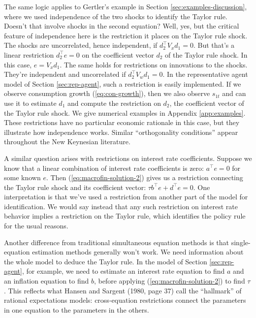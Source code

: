 \documentclass[12pt]{article}
\begin{document}
{The same logic applies to Gertler's example in Section \ref{sec:examples-discussion},
where we used independence of the two shocks to identify the Taylor rule.
Doesn't that involve shocks in the second equation?
Well, yes, but the critical feature of independence here
is the restriction it places on the Taylor rule shock.
The shocks are uncorrelated, hence independent, if $d_2^\top V_x d_1 = 0$.
But that's a linear restriction $d_2^\top e = 0$ on the coefficient vector $d_2$ of the Taylor rule shock.  In this case, $e = V_x d_1$.
The same holds for restrictions on innovations to the shocks.
They're independent and uncorrelated if $d_2^\top V_w d_1 = 0$.
In the representative agent model of Section \ref{sec:rep-agent},
such a restriction is easily implemented.
If we observe consumption growth (\ref{eq:con-growth}),
then we also observe $s_{1t}$ and can use it to estimate $d_1$
and compute the restriction on $d_2$,
the coefficient vector of the Taylor rule shock.
We give numerical examples in Appendix \ref{app:examples}.
These restrictions have no particular economic rationale in this case,
but they illustrate how independence works.
Similar ``orthogonality conditions'' appear throughout the New Keynesian literature.

A similar question arises with restrictions on interest rate coefficients.
Suppose we know that a linear combination of interest rate coefficients is zero:
 $a^\top e = 0$ for some known $e$.
Then (\ref{eq:macrofin-solution-2}) gives us a restriction connecting
the Taylor rule shock and its coefficient vector:
$ \tau b^\top e + d^\top e = 0$.
One interpretation is that we've used a restriction from another part of the model
for identification.
We would say instead that any such restriction on interest rate behavior
implies a restriction on the Taylor rule, which identifies the policy rule for the usual reasons.


Another difference from traditional simultaneous equation methods
is that single-equation estimation methods generally won't work.
We need information about the whole model to deduce the Taylor rule.
In the model of Section \ref{sec:rep-agent}, for example,
we need to estimate an interest rate equation to find $a$ and
an inflation equation to find $b$, before applying (\ref{eq:macrofin-solution-2}) to find $\tau$.
This reflects what Hansen and Sargent (1980, page 37) call the ``hallmark''
of rational expectations models:  cross-equation restrictions
connect the parameters in one equation to the parameters in the others.


}
\end{document}

